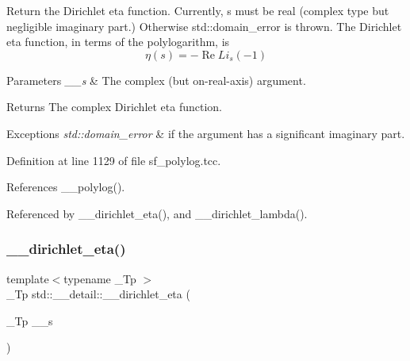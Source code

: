 Return the Dirichlet eta function. Currently, s must be real (complex type but negligible imaginary part.) Otherwise std\+::domain\+\_\+error is thrown. The Dirichlet eta function, in terms of the polylogarithm, is \[ \renewcommand\Re{\operatorname{Re}} \renewcommand\Im{\operatorname{Im}} \eta(s) = -\Re{Li_s(-1)} \]


\begin{DoxyParams}{Parameters}
{\em \+\_\+\+\_\+s} & The complex (but on-\/real-\/axis) argument. \\
\hline
\end{DoxyParams}
\begin{DoxyReturn}{Returns}
The complex Dirichlet eta function. 
\end{DoxyReturn}

\begin{DoxyExceptions}{Exceptions}
{\em std\+::domain\+\_\+error} & if the argument has a significant imaginary part. \\
\hline
\end{DoxyExceptions}


Definition at line 1129 of file sf\+\_\+polylog.\+tcc.



References \+\_\+\+\_\+polylog().



Referenced by \+\_\+\+\_\+dirichlet\+\_\+eta(), and \+\_\+\+\_\+dirichlet\+\_\+lambda().

\mbox{\label{namespacestd_1_1____detail_a88be5bbcdf85bbc487b6b86b5cb65d98}} 
\subsubsection{\texorpdfstring{\+\_\+\+\_\+dirichlet\+\_\+eta()}{\_\_dirichlet\_eta()}\hspace{0.1cm}{\footnotesize\ttfamily [2/2]}}
{\footnotesize\ttfamily template$<$typename \+\_\+\+Tp $>$ \\
\+\_\+\+Tp std\+::\+\_\+\+\_\+detail\+::\+\_\+\+\_\+dirichlet\+\_\+eta (\begin{DoxyParamCaption}\item[{\+\_\+\+Tp}]{\+\_\+\+\_\+s }\end{DoxyParamCaption})}

